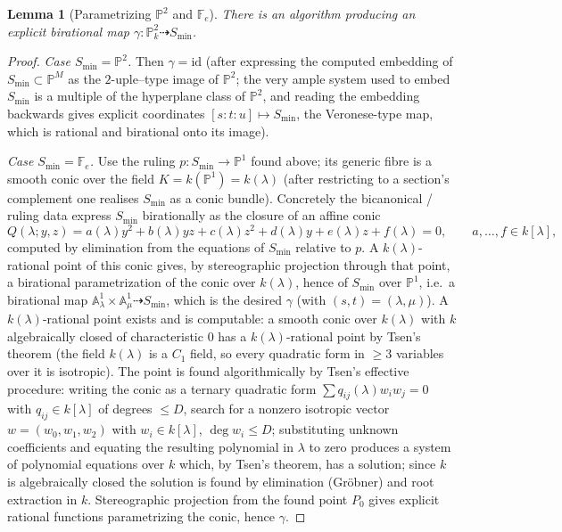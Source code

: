 \documentclass{amsart}
\theoremstyle{plain}
\newtheorem{lemma}{Lemma}
\theoremstyle{definition}
\newcommand{\PP}{\mathbb{P}}
\newcommand{\AA}{\mathbb{A}}
\begin{document}
\begin{lemma}[Parametrizing $\PP^2$ and $\mathbb F_e$]\label{lem:param-min}
There is an algorithm producing an explicit birational map
$\gamma\colon\PP^2_k\dashrightarrow S_{\min}$.
\end{lemma}

\begin{proof}
\emph{Case $S_{\min}=\PP^2$.}  Then $\gamma=\mathrm{id}$ (after expressing the
computed embedding of $S_{\min}\subset\PP^M$ as the $2$-uple--type image of
$\PP^2$; the very ample system used to embed $S_{\min}$ is a multiple of the
hyperplane class of $\PP^2$, and reading the embedding backwards gives explicit
coordinates $[s:t:u]\mapsto S_{\min}$, the Veronese-type map, which is rational
and birational onto its image).

\emph{Case $S_{\min}=\mathbb F_e$.}  Use the ruling $p\colon S_{\min}\to\PP^1$
found above; its generic fibre is a smooth conic over the field
$K=k(\PP^1)=k(\lambda)$ (after restricting to a section's complement one
realises $S_{\min}$ as a conic bundle).  Concretely the bicanonical / ruling
data express $S_{\min}$ birationally as the closure of an affine conic
\[
Q(\lambda;y,z)=a(\lambda)y^2+b(\lambda)yz+c(\lambda)z^2+d(\lambda)y+e(\lambda)z+f(\lambda)=0,
\qquad a,\dots,f\in k[\lambda],
\]
computed by elimination from the equations of $S_{\min}$ relative to $p$.  A
$k(\lambda)$-rational point of this conic gives, by stereographic projection
through that point, a birational parametrization of the conic over $k(\lambda)$,
hence of $S_{\min}$ over $\PP^1$, i.e.\ a birational map
$\AA^1_{\lambda}\times\AA^1_{\mu}\dashrightarrow S_{\min}$, which is the desired
$\gamma$ (with $(s,t)=(\lambda,\mu)$).  A $k(\lambda)$-rational point exists and
is computable: a smooth conic over $k(\lambda)$ with $k$ algebraically closed of
characteristic $0$ has a $k(\lambda)$-rational point by Tsen's theorem (the field
$k(\lambda)$ is a $C_1$ field, so every quadratic form in $\ge3$ variables over
it is isotropic).  The point is found algorithmically by Tsen's effective
procedure: writing the conic as a ternary quadratic form
$\sum q_{ij}(\lambda)w_iw_j=0$ with $q_{ij}\in k[\lambda]$ of degrees $\le D$,
search for a nonzero isotropic vector $w=(w_0,w_1,w_2)$ with $w_i\in k[\lambda]$,
$\deg w_i\le D$; substituting unknown coefficients and equating the resulting
polynomial in $\lambda$ to zero produces a system of polynomial equations over
$k$ which, by Tsen's theorem, has a solution; since $k$ is algebraically closed
the solution is found by elimination (Gr\"obner) and root extraction in $k$.
Stereographic projection from the found point $P_0$ gives explicit rational
functions parametrizing the conic, hence $\gamma$.
\end{proof}
\end{document}
